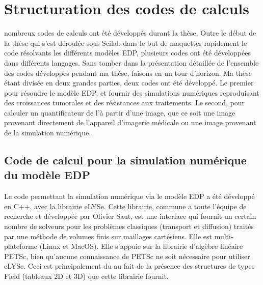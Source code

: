 \documentclass[main.tex]{subfiles}
\begin{document}
\chapter{Structuration des codes de calculs \label{chap:structure_code} }
 nombreux codes de calculs ont été développés durant la thèse. Outre le début de la thèse qui s'est déroulée sous Scilab dans le but de maquetter rapidement le code résolvants les différents modèles EDP, plusieurs codes ont été développées dans différents langages. 
Sans tomber dans la présentation détaillée de l'ensemble des codes développés pendant ma thèse, faisons en un tour d'horizon. Ma thèse étant divisée en deux grandes parties, deux codes ont été développé. Le premier pour résoudre le modèle EDP, et fournir des simulations numériques reproduisant des croissances tumorales et des résistances aux traitements. Le second, pour calculer un quantificateur de l'\hetero à partir d'une image, que ce soit une image provenant directement de l'appareil d'imagerie médicale ou une image provenant de la simulation numérique.  

\section{Code de calcul pour la simulation numérique du modèle EDP}
Le code permettant la simulation numérique via le modèle EDP a été développé en C++, avec la librairie eLYSe. Cette librairie, commune a toute l'équipe de recherche et développée par Olivier Saut, est une interface qui fournit un certain nombre de solveurs pour les problèmes classiques (transport et diffusion) traités par une méthode de volumes finis sur maillages cartésiens. Elle est multi-plateforme (Linux et MacOS). 
Elle s'appuie sur la librairie d'algèbre linéaire PETSc, bien qu'aucune connaissance de PETSc ne soit nécessaire pour utiliser eLYSe. 
Ceci est principalement du au fait de la présence des structures de types Field (tableaux 2D et 3D) que cette librairie fournit. 
\end{document}

